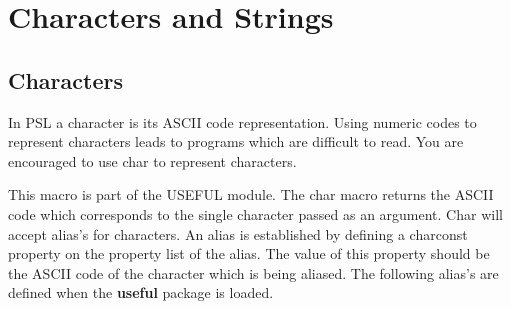 \chapter{Characters and Strings}

\section{Characters}

  In  PSL  a  character is its ASCII code representation.  Using
numeric codes to represent characters leads  to  programs  which
are  difficult  to  read.    You  are  encouraged to use char to
represent characters.


{    This macro is part of the USEFUL module.    The  char  macro
    returns  the  ASCII  code  which  corresponds  to the single
    character passed as an argument.  Char will  accept  alias's
    for  characters.    An  alias  is  established by defining a
    charconst property on the property list of the alias.    The
    value  of  this  property  should  be  the ASCII code of the
    character which is being aliased.  The following alias's are
    defined when the {\bf useful} package is loaded.
}

